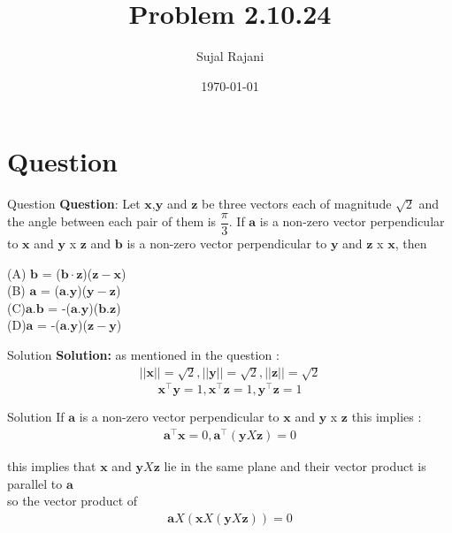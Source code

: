 \documentclass{beamer}
\title{Problem 2.10.24}
\author{Sujal Rajani}
\date{\today}
\let\vec\mathbf
\theoremstyle{remark}
\numberwithin{equation}{section}
\begin{document}
\begin{frame}
\titlepage
\end{frame}


\section{Question}
\begin{frame}{Question}
\textbf{Question}:
 \noindent  Let $\vec{x}$,$\vec{y}$ and $\vec{z}$ be three vectors each of magnitude $\sqrt 2$ and the angle between each pair of them is $\dfrac{\pi}{3}$. If $\vec{a}$ is a non-zero vector perpendicular to $\vec{x}$ and $\vec{y}$ x $\vec{z}$ and $\vec{b}$ is a non-zero vector perpendicular to $\vec{y}$ and $\vec{z}$ x $\vec{x}$, then
 
 
  (A) $\vec{b}$ = ($\vec{b}\cdot\vec{z}$)($\vec{z}-\vec{x}$)
  \\
(B) $\vec{a}$ = ($\vec{a}.\vec{y}$)($\vec{y}-\vec{z}$)
 \\
 (C)$\vec{a}.\vec{b}$ = -($\vec{a}.\vec{y}$)($\vec{b}.\vec{z}$)
 \\
 (D)$\vec{a}$ = -($\vec{a}.\vec{y}$)($\vec{z}-\vec{y}$)
 
 
\end{frame}
\begin{frame}{Solution}
\textbf{Solution:} 
as mentioned in the question : 
\begin{align*}
    ||\vec{x}||=\sqrt{2},
    ||\vec{y}||=\sqrt{2},
    ||\vec{z}||=\sqrt{2}
    \end{align*}
    \begin{equation}
\vec{x}^\top\vec{y}=1,\vec{x}^\top\vec{z}=1,\vec{y}^\top\vec{z}=1
\end{equation}

\end{frame}
\begin{frame}{Solution}
If $\vec{a}$ is a non-zero vector perpendicular to $\vec{x}$ and $\vec{y}$ x $\vec{z}$ this implies :
\\
\begin{align*}
    \vec{a}^\top\vec{x}=0, \vec{a}^\top(\vec{y} X \vec{z})=0
\end{align*}


this implies that  $\vec{x}$ and $\vec{y} X \vec{z}$ lie in the same plane and their vector product is parallel to $\vec{a}$
\\
so the vector product of 
\\
\begin{align*}
    \vec{a}X(\vec{x}X(\vec{y} X \vec{z}))=0
\end{align*}
\end{frame}
\end{document}
